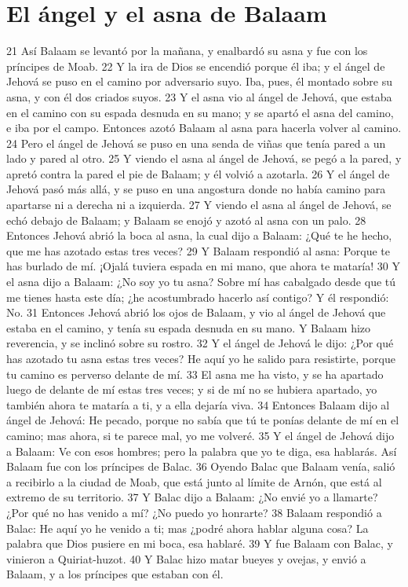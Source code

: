 \section*{El ángel y el asna de Balaam}

21 Así Balaam se levantó por la mañana, y enalbardó su asna y fue con los príncipes de Moab.
22 Y la ira de Dios se encendió porque él iba; y el ángel de Jehová se puso en el camino por adversario suyo. Iba, pues, él montado sobre su asna, y con él dos criados suyos.
23 Y el asna vio al ángel de Jehová, que estaba en el camino con su espada desnuda en su mano; y se apartó el asna del camino, e iba por el campo. Entonces azotó Balaam al asna para hacerla volver al camino.
24 Pero el ángel de Jehová se puso en una senda de viñas que tenía pared a un lado y pared al otro.
25 Y viendo el asna al ángel de Jehová, se pegó a la pared, y apretó contra la pared el pie de Balaam; y él volvió a azotarla.
26 Y el ángel de Jehová pasó más allá, y se puso en una angostura donde no había camino para apartarse ni a derecha ni a izquierda.
27 Y viendo el asna al ángel de Jehová, se echó debajo de Balaam; y Balaam se enojó y azotó al asna con un palo.
28 Entonces Jehová abrió la boca al asna, la cual dijo a Balaam: ¿Qué te he hecho, que me has azotado estas tres veces?
29 Y Balaam respondió al asna: Porque te has burlado de mí. ¡Ojalá tuviera espada en mi mano, que ahora te mataría!
30 Y el asna dijo a Balaam: ¿No soy yo tu asna? Sobre mí has cabalgado desde que tú me tienes hasta este día; ¿he acostumbrado hacerlo así contigo? Y él respondió: No.
31 Entonces Jehová abrió los ojos de Balaam, y vio al ángel de Jehová que estaba en el camino, y tenía su espada desnuda en su mano. Y Balaam hizo reverencia, y se inclinó sobre su rostro.
32 Y el ángel de Jehová le dijo: ¿Por qué has azotado tu asna estas tres veces? He aquí yo he salido para resistirte, porque tu camino es perverso delante de mí.
33 El asna me ha visto, y se ha apartado luego de delante de mí estas tres veces; y si de mí no se hubiera apartado, yo también ahora te mataría a ti, y a ella dejaría viva.
34 Entonces Balaam dijo al ángel de Jehová: He pecado, porque no sabía que tú te ponías delante de mí en el camino; mas ahora, si te parece mal, yo me volveré.
35 Y el ángel de Jehová dijo a Balaam: Ve con esos hombres; pero la palabra que yo te diga, esa hablarás. Así Balaam fue con los príncipes de Balac.
36 Oyendo Balac que Balaam venía, salió a recibirlo a la ciudad de Moab, que está junto al límite de Arnón, que está al extremo de su territorio.
37 Y Balac dijo a Balaam: ¿No envié yo a llamarte? ¿Por qué no has venido a mí? ¿No puedo yo honrarte?
38 Balaam respondió a Balac: He aquí yo he venido a ti; mas ¿podré ahora hablar alguna cosa? La palabra que Dios pusiere en mi boca, esa hablaré.
39 Y fue Balaam con Balac, y vinieron a Quiriat-huzot.
40 Y Balac hizo matar bueyes y ovejas, y envió a Balaam, y a los príncipes que estaban con él.
